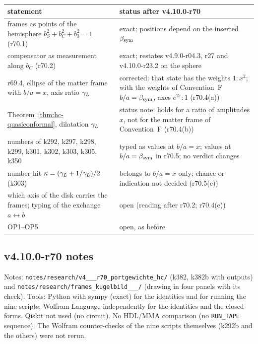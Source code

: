 \begin{center}
\small
\begin{tabular}{@{}>{\raggedright\arraybackslash}p{}>{\raggedright\arraybackslash}p{}@{}}
\toprule
statement & status after v4.10.0-r70\\
\midrule
frames as points of the hemisphere \(b_S^2+b_C^2+b_3^2=1\) (r70.1) & exact; positions depend on the inserted \(\beta_{\mathrm{sym}}\)\\
compensator as measurement along \(b_C\) (r70.2) & exact; restates v4.9.0-r04.3, r27 and v4.10.0-r23.2 on the sphere\\
r69.4, ellipse of the matter frame with \(b/a=x\), axis ratio \(\gamma_L\) & corrected: that state has the weights \(1:x^2\); with the weights of Convention~F \(b/a=\beta_{\mathrm{sym}}\), axes \(e^{2\varepsilon}:1\) (r70.4(a))\\
Theorem~\ref{thm:hc-quasiconformal}, dilatation \(\gamma_L\) & status note: holds for a ratio of amplitudes \(x\), not for the matter frame of Convention~F (r70.4(b))\\
numbers of k292, k297, k298, k299, k301, k302, k303, k305, k350 & typed as values at \(b/a=x\); values at \(b/a=\beta_{\mathrm{sym}}\) in r70.5; no verdict changes\\
number hit \(\kappa=(\gamma_L+1/\gamma_L)/2\) (k303) & belongs to \(b/a=x\) only; chance or indication not decided (r70.5(c))\\
which axis of the disk carries the frames; typing of the exchange \(a\leftrightarrow b\) & open (reading after r70.2; r70.4(c))\\
OP1--OP5 & open, as before\\
\bottomrule
\end{tabular}
\end{center}

\subsection*{v4.10.0-r70 notes}
\label{subsec:v4100-r70-notes}

{\raggedright
Notes: \texttt{notes/\allowbreak research/\allowbreak v4\_\_\_\allowbreak r70\_\allowbreak portgewichte\_\allowbreak hc/}
(k382, k382b with outputs) and \texttt{notes/\allowbreak research/\allowbreak frames\_\allowbreak kugelbild\_\_\_/}
(drawing in four panels with its check).
Tools: Python with sympy (exact) for the identities and for running the nine scripts; Wolfram Language independently for the identities and
the closed forms.  Qiskit not used (no circuit).  No HDL/MMA comparison (no \texttt{RUN\_TAPE} sequence).  The Wolfram counter-checks of the nine
scripts themselves (k292b and the others) were not rerun.
\par}

